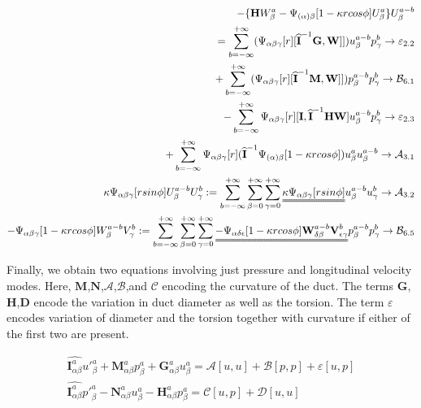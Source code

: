 \documentclass{Note}
\begin{document}
\begin{equation}
\begin{aligned}
-\{\textbf{H}W_\beta^a-\Psi_{(\alpha)\beta}[1-\kappa r cos\phi]U_\beta^a \}U_\beta^{a-b}\\
=\sum_{b=-\infty}^{+\infty}(\Psi_{\alpha\beta\gamma}[r][\widehat{\textbf{I}}^{-1} \textbf{G},\textbf{W}]])u_\beta^{a-b}p_\gamma^{b}\rightarrow \mathcal{\varepsilon}_{2.2}\\
+\sum_{b=-\infty}^{+\infty}(\Psi_{\alpha\beta\gamma}[r][\widehat{\textbf{I}}^{-1} \textbf{M},\textbf{W}]])p_\beta^{a-b}p_\gamma^{b}\rightarrow\mathcal{B}_{6.1}\\
-\sum_{b=-\infty}^{+\infty}\Psi_{\alpha\beta\gamma}[r][\textbf{I},\widehat{\textbf{I}}^{-1}\textbf{HW}]u_\beta^{a-b}p_\gamma^{b}\rightarrow \mathcal{\varepsilon}_{2.3}\\
+\sum_{b=-\infty}^{+\infty}\Psi_{\alpha\beta\gamma}[r]  (\widehat{\textbf{I}}^{-1}\Psi_{(\alpha)\beta}[1-\kappa r cos\phi])u_\beta^a u_\beta^{a-b}  \rightarrow \mathcal{A}_{3.1}\\ 
\kappa \Psi_{\alpha\beta\gamma}[rsin\phi]U_\beta^{a-b}U_\gamma^b:=\sum_{b=-\infty}^{+\infty} \sum_{\beta=0}^{+\infty}\sum_{\gamma=0}^{+\infty}\uuline{\kappa \Psi_{\alpha\beta\gamma}[ r sin\phi]}u_\beta^{a-b}u_\gamma^{b}\rightarrow\mathcal{A}_{3.2}\\
- \Psi_{\alpha\beta\gamma}[1-\kappa r cos\phi]W_\beta^{a-b}V_\gamma^b:=\sum_{b=-\infty}^{+\infty} \sum_{\beta=0}^{+\infty}\sum_{\gamma=0}^{+\infty}\uuline{ -\Psi_{\alpha\delta\epsilon}[1-\kappa r cos\phi]\textbf{W}_{\delta\beta}^{a-b}\textbf{V}_{\epsilon\gamma}^{b}}p_\beta^{a-b}p_\gamma^{b}\rightarrow\mathcal{B}_{6.5}\\
\end{aligned}
\end{equation}


Finally, we obtain two equations involving just pressure and longitudinal velocity modes. Here, $\textbf{M}$,$\textbf{N}$,$\mathcal{A}$,$\mathcal{B}$,and $\mathcal{C}$ encoding the curvature of the duct. The terms $\textbf{G}$,$\textbf{H}$,$\textbf{D}$ encode the variation in duct diameter as well as the torsion. The term $\varepsilon$ encodes variation of diameter and the torsion together with curvature if either of the first two are present.

\begin{equation}
\begin{aligned}
\widehat{\textbf{I}_{\alpha\beta}^a} {u'}_\beta^a+\textbf{M}_{\alpha\beta}^a p_\beta^a + \textbf{G}_{\alpha\beta}^a u_\beta^a=\mathcal{A}[u,u]+\mathcal{B}[p,p]+\varepsilon[u,p]\\
\widehat{\textbf{I}_{\alpha\beta}^a} {p'}_\beta^a-\textbf{N}_{\alpha\beta}^a u_\beta^a-\textbf{H}_{\alpha\beta}^a p_\beta^a=\mathcal{C}[u,p]+\mathcal{D}[u,u]
\end{aligned}
\end{equation}
\end{document}
